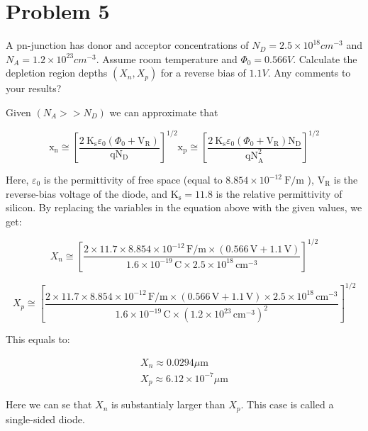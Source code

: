 \section{Problem 5}
A pn-junction has donor and acceptor concentrations of $N_D = 2.5 \times 10^{18} cm^{-3}$ and
$N_A = 1.2 \times 10^{23} cm^{-3}$. Assume room temperature and $\Phi_0 = 0.566 V$. Calculate the
depletion region depths $(X_n, X_p)$ for a reverse bias of $1.1 V$. Any comments to your results?

Given $(N_A>>N_D)$ we can approximate that 

\begin{equation*}
    \mathrm{x}_{\mathrm{n}} \cong\left[\frac{2 \mathrm{~K}_{\mathrm{s}} \varepsilon_{0}\left(\Phi_{0}+\mathrm{V}_{\mathrm{R}}\right)}{\mathrm{q} \mathrm{N}_{\mathrm{D}}}\right]^{1 / 2} \mathrm{x}_{\mathrm{p}} \cong\left[\frac{2 \mathrm{~K}_{\mathrm{s}} \varepsilon_{0}\left(\Phi_{0}+\mathrm{V}_{\mathrm{R}}\right) \mathrm{N}_{\mathrm{D}}}{\mathrm{qN}_{\mathrm{A}}^{2}}\right]^{1 / 2}
\end{equation*}

Here, \( \varepsilon_{0} \) is the permittivity of free space (equal to \( 8.854 \times 10^{-12} \mathrm{~F} / \mathrm{m} \) ), \( \mathrm{V}_{\mathrm{R}} \) is the reverse-bias voltage of the diode, and \( \mathrm{K}_{\mathrm{s}}=11.8 \) is the relative permittivity of silicon. By replacing the variables in the equation above with the given values, we get:

\begin{equation*}
    X_n \cong \left[\frac{2 \times 11.7 \times 8.854 \times 10^{-12} \, \text{F/m} \times (0.566 \, \text{V} + 1.1 \, \text{V})}{1.6 \times 10^{-19} \, \text{C} \times 2.5 \times 10^{18} \, \text{cm}^{-3}}\right]^{1/2}
\end{equation*}

\begin{equation*}
    X_p \cong \left[\frac{2 \times 11.7 \times 8.854 \times 10^{-12} \, \text{F/m} \times (0.566 \, \text{V} + 1.1 \, \text{V}) \times 2.5 \times 10^{18} \, \text{cm}^{-3}}{1.6 \times 10^{-19} \, \text{C} \times (1.2 \times 10^{23} \, \text{cm}^{-3})^2}\right]^{1/2}
\end{equation*}

This equals to:

\begin{equation*}
    \begin{array}
        {l}X_{n} \approx 0.0294 \mu \mathrm{m} \\ X_{p} \approx 6.12 \times 10^{-7} \mu \mathrm{m}
    \end{array} 
\end{equation*}

Here we can se that $X_n$ is substantialy larger than $X_p$. This case is called a single-sided diode.